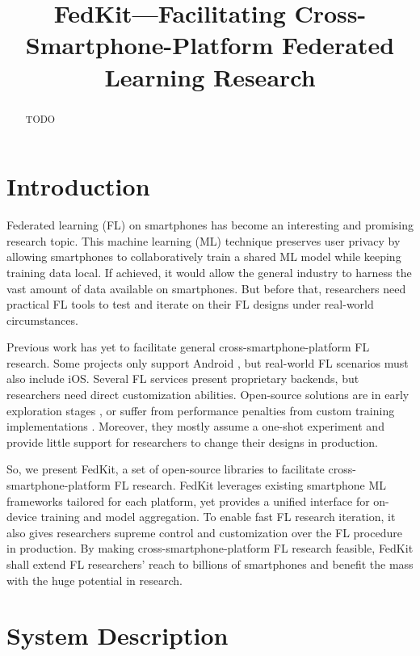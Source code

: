 \documentclass[letterpaper]{article} %
\title{FedKit---Facilitating Cross-Smartphone-Platform Federated Learning Research}
\author{}
\begin{document}
\maketitle

\begin{abstract}
    TODO
\end{abstract}

\section{Introduction}

Federated learning (FL) on smartphones has become an interesting and
promising research topic.
This machine learning (ML) technique preserves user privacy by
allowing smartphones to collaboratively train a shared ML model while
keeping training data local.
If achieved, it would allow the general industry to
harness the vast amount of data available on smartphones.
But before that, researchers need practical FL tools to test and
iterate on their FL designs under real-world circumstances.

Previous work has yet to facilitate general cross-smartphone-platform
FL research.
Some projects only support Android
\cite{he2020fedml,madrigal2023project},
but real-world FL scenarios must also include iOS.
Several FL services present proprietary backends,
but researchers need direct customization abilities.
Open-source solutions are in early exploration stages
\cite{beutel2020flower,mathur2021ondevice},
or suffer from performance penalties from custom training implementations
\cite{ryffel2018generic,Ziller2021,hall2021syft}.
Moreover, they mostly assume a one-shot experiment and
provide little support for researchers to change their designs in production.

So, we present FedKit,
a set of open-source libraries to facilitate
cross-smartphone-platform FL research.
FedKit leverages existing smartphone ML frameworks tailored for each platform,
yet provides a unified interface for on-device training and model aggregation.
To enable fast FL research iteration,
it also gives researchers supreme control and customization over
the FL procedure in production.
By making cross-smartphone-platform FL research feasible,
FedKit shall extend FL researchers' reach to billions of smartphones and
benefit the mass with the huge potential in research.

\section{System Description}
\end{document}
